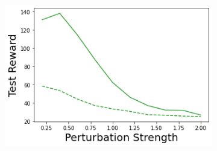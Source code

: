 \begin{figure}
\begin{subfigure}{.24\textwidth}
    \end{subfigure}
    \begin{subfigure}{.24\textwidth}
        \includegraphics[width=\textwidth]{sections/011_icml2022/resources/state_shift-PostNet-CartPoleShift-v0-mean_reward_.png}
    \end{subfigure}
    

\end{figure}
